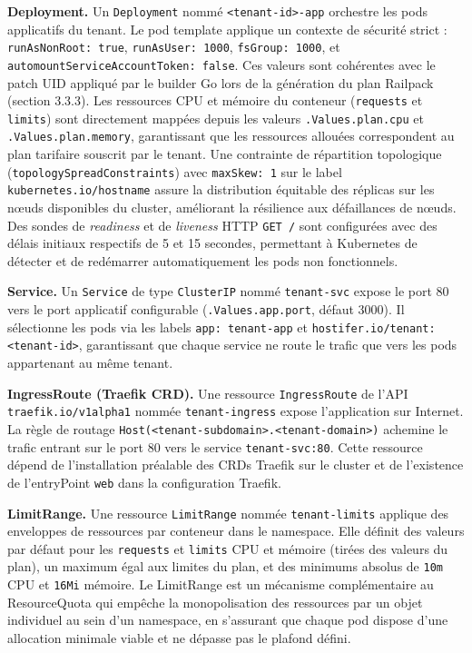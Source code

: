 \textbf{Deployment.} Un \texttt{Deployment} nommé \texttt{<tenant-id>-app} orchestre les pods applicatifs du tenant. Le pod template applique un contexte de sécurité strict : \texttt{runAsNonRoot: true}, \texttt{runAsUser: 1000}, \texttt{fsGroup: 1000}, et \texttt{automountServiceAccountToken: false}. Ces valeurs sont cohérentes avec le patch UID appliqué par le builder Go lors de la génération du plan Railpack (section 3.3.3). Les ressources CPU et mémoire du conteneur (\texttt{requests} et \texttt{limits}) sont directement mappées depuis les valeurs \texttt{.Values.plan.cpu} et \texttt{.Values.plan.memory}, garantissant que les ressources allouées correspondent au plan tarifaire souscrit par le tenant. Une contrainte de répartition topologique (\texttt{topologySpreadConstraints}) avec \texttt{maxSkew: 1} sur le label \texttt{kubernetes.io/hostname} assure la distribution équitable des réplicas sur les nœuds disponibles du cluster, améliorant la résilience aux défaillances de nœuds. Des sondes de \textit{readiness} et de \textit{liveness} HTTP \texttt{GET /} sont configurées avec des délais initiaux respectifs de 5 et 15 secondes, permettant à Kubernetes de détecter et de redémarrer automatiquement les pods non fonctionnels.

\textbf{Service.} Un \texttt{Service} de type \texttt{ClusterIP} nommé \texttt{tenant-svc} expose le port 80 vers le port applicatif configurable (\texttt{.Values.app.port}, défaut 3000). Il sélectionne les pods via les labels \texttt{app: tenant-app} et \texttt{hostifer.io/tenant: <tenant-id>}, garantissant que chaque service ne route le trafic que vers les pods appartenant au même tenant.

\textbf{IngressRoute (Traefik CRD).} Une ressource \texttt{IngressRoute} de l'API \texttt{traefik.io/v1alpha1} nommée \texttt{tenant-ingress} expose l'application sur Internet. La règle de routage \texttt{Host(<tenant-subdomain>.<tenant-domain>)} achemine le trafic entrant sur le port 80 vers le service \texttt{tenant-svc:80}. Cette ressource dépend de l'installation préalable des CRDs Traefik sur le cluster et de l'existence de l'entryPoint \texttt{web} dans la configuration Traefik.

\textbf{LimitRange.} Une ressource \texttt{LimitRange} nommée \texttt{tenant-limits} applique des enveloppes de ressources par conteneur dans le namespace. Elle définit des valeurs par défaut pour les \texttt{requests} et \texttt{limits} CPU et mémoire (tirées des valeurs du plan), un maximum égal aux limites du plan, et des minimums absolus de \texttt{10m} CPU et \texttt{16Mi} mémoire. Le LimitRange est un mécanisme complémentaire au ResourceQuota qui empêche la monopolisation des ressources par un objet individuel au sein d'un namespace, en s'assurant que chaque pod dispose d'une allocation minimale viable et ne dépasse pas le plafond défini. 

